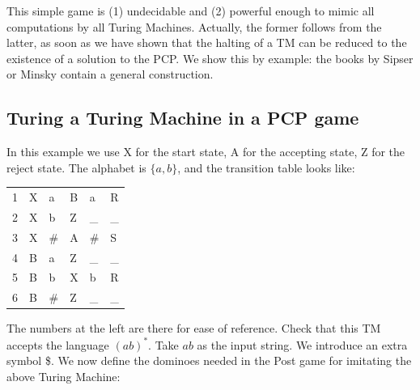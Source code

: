 This simple game is (1) undecidable and (2) powerful enough to mimic all
computations by all Turing Machines. Actually, the former follows from
the latter, as soon as we have shown that the halting of a TM can be
reduced to the existence of a solution to the PCP. We show this by
example: the books by Sipser or Minsky contain a general construction.

\subsection{Turing a Turing Machine in a PCP game}

In this example we use X for the start state, A for the accepting
state, Z for the reject state. The alphabet is $\{a,b\}$, and the
transition table looks like:

\begin{center}
\begin{tabular}{|r||l|l||l|l|l|}
\hline
1 & X & a & B & a & R \\
2 & X & b & Z & \_ & \_ \\
3 & X & \# & A & \# & S \\
4 & B & a  & Z & \_ & \_ \\
5 & B & b  & X & b  & R  \\
6 & B & \# & Z & \_ & \_ \\
\hline
\end{tabular}
\end{center}

The numbers at the left are there for ease of reference. Check that
this TM accepts the language $(ab)^*$. Take $ab$ as the input string.
%
We introduce an extra symbol \$. We now define the dominoes needed in
the Post game for imitating the above Turing Machine:

